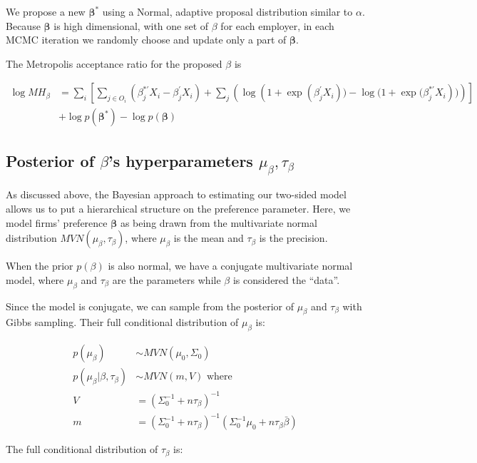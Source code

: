 We propose a new $\bm{\beta}^*$ using a Normal, adaptive proposal distribution
similar to $\alpha$. Because $\bm{\beta}$ is high dimensional, with one set of
$\beta$ for each employer, in each MCMC iteration we randomly choose and update
only a part of $\bm{\beta}$.

The Metropolis acceptance ratio for the proposed $\beta$ is

\begin{align}
  \log MH_\beta &= \sum_i \left[ \sum_{j \in O_i} \left(\beta_j^{*\prime}X_i - \beta_j^{\prime}X_i \right) + \sum_{j} \left( \log(1 + {\exp({\beta_j^{\prime}X_i})) - \log(1 +  \exp(\beta_j^{*\prime}X_i})) \right) \right] \nonumber \\
                & + \log p(\bm{\beta}^*) - \log p(\bm{\beta})
\end{align}


\subsection{Posterior of $\beta$'s hyperparameters $\mu_{\beta}, \tau_{\beta}$}

As discussed above, the Bayesian approach to estimating our two-sided model
allows us to put a hierarchical structure on the preference parameter. Here, we
model firms' preference $\bm{\beta}$ as being drawn from the multivariate normal
distribution $MVN(\mu_{\beta}, \tau_{\beta})$, where $\mu_{\beta}$ is the mean
and $\tau_{\beta}$ is the precision.

When the prior $p(\beta)$ is also normal, we have a conjugate multivariate
normal model, where $\mu_{\beta}$ and $\tau_{\beta}$ are the parameters while
$\beta$ is considered the ``data''.

Since the model is conjugate, we can sample from the posterior of $\mu_{\beta}$
and $\tau_{\beta}$ with Gibbs sampling. Their full conditional distribution of
$\mu_{\beta}$ is:

\begin{align}
  p(\mu_{\beta}) &\sim MVN(\mu_0, \Sigma_0) \\
  p(\mu_{\beta} | \beta, \tau_{\beta}) &\sim MVN(m, V) \text{ where } \\
  V &= (\Sigma_0^{-1} + n \tau_{\beta})^{-1} \\
  m &= (\Sigma_0^{-1} + n \tau_{\beta})^{-1} (\Sigma_0^{-1}\mu_0 + n \tau_{\beta} \bar \beta)
\end{align}

The full conditional distribution of $\tau_{\beta}$ is:

